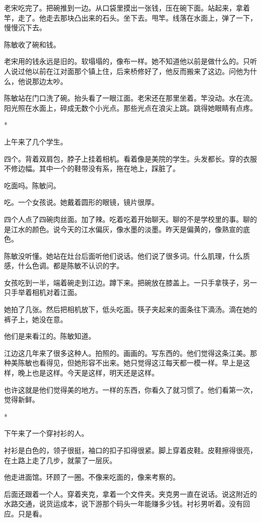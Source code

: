 \documentclass[UTF8,a5paper,11pt,openany]{ctexbook}
\newcommand{\scene}{\vspace{1em}\begin{center}*\quad*\quad*\end{center}\vspace{0.5em}}
\begin{document}
老宋吃完了。把碗推到一边。从口袋里摸出一张钱，压在碗下面。站起来，拿着竿，走了。他走去那块凸出来的石头。坐下去。甩竿。线落在水面上，弹了一下，慢慢沉下去。

陈敏收了碗和钱。

老宋用的钱永远是旧的。软塌塌的，像布一样。她不知道他以前是做什么的。只听人说过他以前在江对面那个镇上住，后来桥修好了，他反而搬来了这边。问他为什么，他说那边太吵。

陈敏站在门口洗了碗。抬头看了一眼江面。老宋还在那里坐着。竿没动。水在流。阳光照在水面上，碎成无数个小光点。那些光点在浪尖上跳。跳得她眼睛有点疼。


\scene

上午来了几个学生。

四个。背着双肩包，脖子上挂着相机。看着像是美院的学生。头发都长。穿的衣服不修边幅。其中一个的鞋带没有系，拖在地上，踩脏了。

吃面吗。陈敏问。

吃。一个女孩说。她戴着圆形的眼镜，镜片很厚。

四个人点了四碗肉丝面。加了辣。吃着吃着开始聊天。聊的不是学校里的事。聊的是江水的颜色。说今天的江水偏灰，像水墨的淡墨。昨天是偏黄的，像熟宣的底色。

陈敏没听懂。她站在灶台后面听他们说话。他们说了很多词。什么肌理，什么质感，什么色调。都是陈敏不认识的字。

女孩吃到一半，端着碗走到江边。蹲下来。把碗放在膝盖上。一只手拿筷子，另一只手举着相机对着江面。

她拍了几张。然后把相机放下，低头吃面。筷子夹起来的面条往下滴汤。滴在她的裤子上，她没在意。

他们是来看江的。陈敏知道。

江边这几年来了很多这种人。拍照的。画画的。写东西的。他们觉得这条江美。那种美陈敏也看得见，但她形容不出来。她只觉得这江每天都一模一样。早上是这样，晚上也是这样。今天是这样，明天还是这样。

也许这就是他们觉得美的地方。一样的东西，你看久了就习惯了。他们看第一次，觉得新鲜。


\scene

下午来了一个穿衬衫的人。

衬衫是白色的，领子很挺，袖口的扣子扣得很紧。脚上穿着皮鞋。皮鞋擦得很亮，在土路上走了几步，就蒙了一层灰。

他走进面馆。环顾了一圈。不像来吃面的，像来考察的。

后面还跟着一个人。穿着夹克，拿着一个文件夹。夹克男一直在说话。说这附近的水路交通，说货运成本，说下游那个码头一年能赚多少钱。衬衫男听着。没有回应。只是看。
\end{document}
